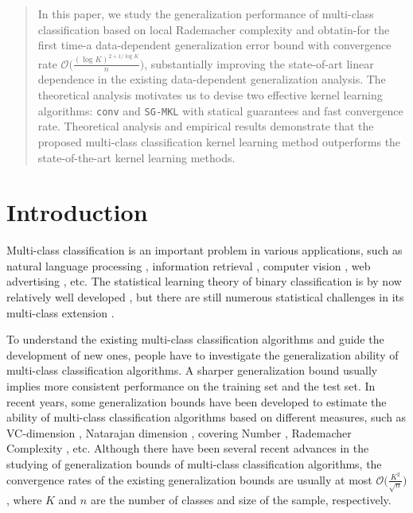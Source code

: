 \documentclass{article}
\begin{document}
\printAffiliationsAndNotice{\icmlEqualContribution} %

\begin{abstract}
    In this paper, we study the generalization performance of multi-class classification based on local Rademacher complexity and obtatin-for the first time-a data-dependent generalization error bound with convergence rate $\mathcal{O}\big(\frac{(\log K)^{2+{1}/{\log K}}}{n}\big)$, substantially improving the state-of-art linear dependence in the existing data-dependent generalization analysis. The theoretical analysis motivates us to devise two effective kernel learning algorithms: \texttt{conv} and \texttt{SG-MKL} with statical guarantees and fast convergence rate. Theoretical analysis and empirical results demonstrate that the proposed multi-class classification kernel learning method outperforms the state-of-the-art kernel learning methods.

\end{abstract}

\section{Introduction}
\label{submission}
Multi-class classification is an important problem in various applications,
such as natural language processing \cite{Zhang2005cs}, information retrieval \cite{hofmann2003learning}, computer vision \cite{deng2009imagenet},
web advertising \cite{beygelzimer2009conditional}, etc.
The statistical learning theory of binary classification is by now relatively well developed \cite{vapnik1998naturestatistical,mohri2012foundations},
but there are still numerous statistical challenges in its multi-class extension \cite{maximov2016tight}.

To understand the existing multi-class classification algorithms and guide the development of new ones,
people have to investigate the generalization ability of multi-class classification algorithms.
A sharper generalization bound usually implies more consistent
performance on the training set and the test set.
In recent years, some generalization bounds have been developed to
estimate the ability of multi-class classification algorithms based on different measures,
such as
VC-dimension \cite{allwein2000reducing},
Natarajan dimension \cite{Natarajan1989,daniely2014optimal},
covering Number \cite{guermeur2002combining,zhang2004statistical,Hill2007},
Rademacher Complexity \cite{koltchinskii2002empirical,koltchinskii2001some,mohri2012foundations,cortes2013multi,maximov2016tight}, etc.
Although there have been several recent advances in the studying of
generalization bounds of multi-class classification algorithms,
the convergence rates of the existing generalization bounds are usually at most
 $\mathcal{O}\big(\frac{K^2}{\sqrt{n}}\big)$,
where $K$ and $n$ are the number of classes and size of the sample, respectively.
\end{document}
